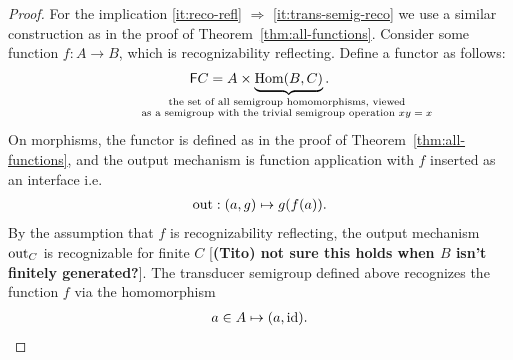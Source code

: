 \begin{proof}
    For the implication \ref{it:reco-refl} $\Rightarrow$ \ref{it:trans-semig-reco} we  use a similar construction as in the proof of Theorem~\ref{thm:all-functions}.
    Consider some function $f : A \to B$, which is recognizability reflecting. Define  a functor as follows:
    \begin{align*}
    \functor C = A \times \myunderbrace{\mathrm{Hom}(B,C)}{the set of all  semigroup  homomorphisms, viewed \\ as a semigroup 
    with the trivial semigroup operation $xy = x$}.
    \end{align*}
    On morphisms, the functor is defined as in the proof of Theorem~\ref{thm:all-functions}, and the output mechanism  is function application with $f$ inserted as an interface i.e.
    \begin{align*}
        \mathrm{out} : (a,g) \mapsto g(f(a)).
    \end{align*}
    By the assumption that $f$ is recognizability reflecting, the output mechanism $\mathrm{out}_C$ is recognizable for finite $C$ [\textbf{(Tito) not sure this holds when $B$ isn't finitely generated?}].
    The transducer semigroup defined above recognizes the function $f$ via the homomorphism 
    \begin{align*}
    a \in A  \mapsto  (a,\mathrm{id}).
    \end{align*} 
    

\end{proof}
